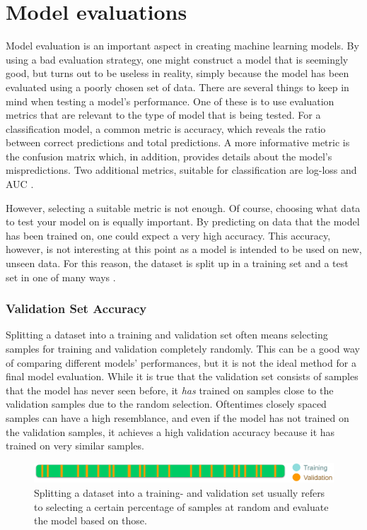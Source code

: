 \section{Model evaluations}
Model evaluation is an important aspect in creating machine learning models. By using a bad evaluation strategy, one might construct a model that is seemingly good, but turns out to be useless in reality, simply because the model has been evaluated using a poorly chosen set of data. There are several things to keep in mind when testing a model's performance. One of these is to use evaluation metrics that are relevant to the type of model that is being tested. For a classification model, a common metric is accuracy, which reveals the ratio between correct predictions and total predictions. A more informative metric is the confusion matrix which, in addition, provides details about the model's mispredictions. Two additional metrics, suitable for classification are log-loss and AUC \citep{zheng_2015}. 

However, selecting a suitable metric is not enough. Of course, choosing what data to test your model on is equally important. By predicting on data that the model has been trained on, one could expect a very high accuracy. This accuracy, however, is not interesting at this point as a model is intended to be used on new, unseen data. For this reason, the dataset is split up in a training set and a test set in one of many ways \citep{raschka}.


\subsubsection{Validation Set Accuracy}
Splitting a dataset into a training and validation set often means selecting samples for training and validation completely randomly. This can be a good way of comparing different models' performances, but it is not the ideal method for a final model evaluation. While it is true that the validation set consists of samples that the model has never seen before, it \textit{has} trained on samples close to the validation samples due to the random selection. Oftentimes closely spaced samples can have a high resemblance, and even if the model has not trained on the validation samples, it achieves a high validation accuracy because it has trained on very similar samples.

\begin{figure}[h]
	\centering
	\includegraphics[scale=0.3]{figs_temp/validation_split.jpg}
	\caption{Splitting a dataset into a training- and validation set usually refers to selecting a certain percentage of samples at random and evaluate the model based on those.}
	\label{fig:validation_split}
\end{figure}


